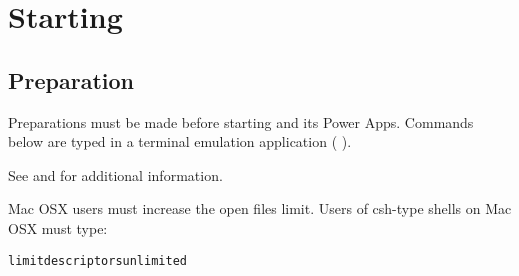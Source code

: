 %
% 
% 
% 
% 
% 
%


%

\chapter{Starting \sr{}}
\label{ch:startingup}


\section{Preparation}
\label{sec:prepare}

Preparations must be made before starting \sr{} and its Power Apps.
Commands below are typed in a terminal emulation application (\eg{}
).

See  and  for additional information.
  
Mac OSX users must increase the open files limit.
Users of csh-type shells on Mac OSX must type:

\begin{alltt}
  limit descriptors unlimited
\end{alltt}

